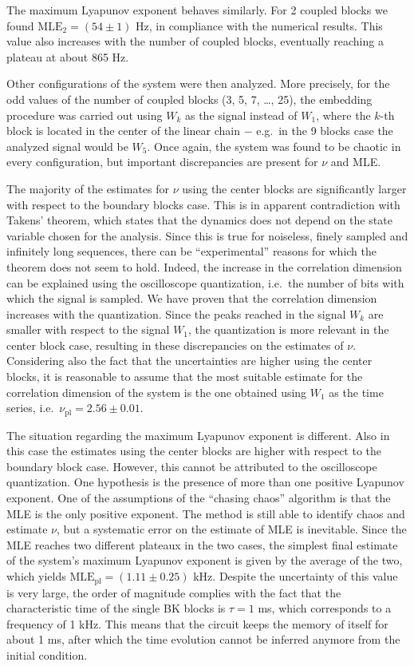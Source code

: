 The maximum Lyapunov exponent behaves similarly. For 2 coupled blocks we found $\text{MLE}_2=(54\pm1)$
Hz, in compliance with the numerical results. This value also increases with the number of coupled
blocks, eventually reaching a plateau at about 865 Hz.

Other configurations of the system were then analyzed. More precisely, for the odd values of the
number of coupled blocks (3, 5, 7, \ldots, 25), the embedding procedure was carried out using
$W_k$ as the signal instead of $W_1$, where the $k$-th block is located in the center of the linear
chain $-$ e.g.\ in the 9 blocks case the analyzed signal would be $W_5$. Once again, the system was
found to be chaotic in every configuration, but important discrepancies are present for $\nu$ and MLE\@.

The majority of the estimates for $\nu$ using the center blocks are significantly larger with respect
to the boundary blocks case. This is in apparent contradiction with Takens' theorem, which states that
the dynamics does not depend on the state variable chosen for the analysis. Since this is true for
noiseless, finely sampled and infinitely long sequences, there can be ``experimental'' reasons for
which the theorem does not seem to hold. Indeed, the increase in the correlation dimension can be
explained using the oscilloscope quantization, i.e.\ the number of bits with which the signal is sampled.
We have proven that the correlation dimension increases with the quantization. Since the peaks
reached in the signal $W_k$ are smaller with respect to the signal $W_1$, the quantization is more
relevant in the center block case, resulting in these discrepancies on the estimates of $\nu$.
Considering also the fact that the uncertainties are higher using the center blocks, it is reasonable
to assume that the most suitable estimate for the correlation dimension of the system is the one
obtained using $W_1$ as the time series, i.e.\ $\nu_{\text{pl}}=2.56\pm0.01$.

The situation regarding the maximum Lyapunov exponent is different. Also in this case the estimates using
the center blocks are higher with respect to the boundary block case. However, this cannot be
attributed to the oscilloscope quantization. One hypothesis is the presence of more than
one positive Lyapunov exponent. One of the assumptions of the ``chasing chaos'' algorithm is that
the MLE is the only positive exponent. The method is still able to identify chaos and estimate $\nu$,
but a systematic error on the estimate of MLE is inevitable. Since the MLE reaches two different
plateaux in the two cases, the simplest final estimate of the system's maximum Lyapunov exponent
is given by the average of the two, which yields $\text{MLE}_{\text{pl}}=(1.11\pm0.25)$ kHz. Despite
the uncertainty of this value is very large, the order of magnitude complies with the fact that the
characteristic time of the single BK blocks is $\tau=1$ ms, which corresponds to a frequency of 1 kHz.
This means that the circuit keeps the memory of itself for about 1 ms, after which the time evolution
cannot be inferred anymore from the initial condition.

